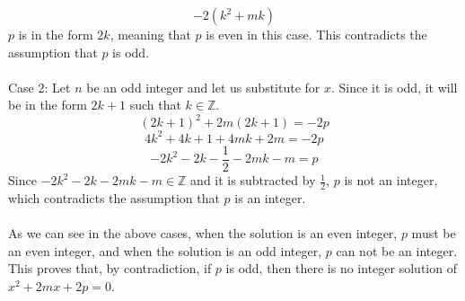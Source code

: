 \documentclass{article}
\begin{document}
\begin{enumerate}[label=\textbf{\arabic*}.]
    \[-2(k^2+mk)\]
    $p$ is in the form $2k$, meaning that $p$ is even in this case. This contradicts the assumption that $p$ is odd.\\\\
    Case 2: Let $n$ be an odd integer and let us substitute for $x$. Since it is odd, it will be in the form $2k+1$ such that $k \in \mathbb{Z}$.
    \[(2k+1)^2+2m(2k+1)=-2p\]
    \[4k^2+4k+1+4mk+2m=-2p\]
    \[-2k^2-2k-\frac{1}{2}-2mk-m=p\]
    Since $-2k^2-2k-2mk-m \in \mathbb{Z}$ and it is subtracted by $\frac{1}{2}$, $p$ is not an integer, which contradicts the assumption that $p$ is an integer. \\\\
    As we can see in the above cases, when the solution is an even integer, $p$ must be an even integer, and when the solution is an odd integer, $p$ can not be an integer. This proves that, by contradiction, if $p$ is odd, then there is no integer solution of $x^2+2mx+2p=0$.
\end{enumerate}
\end{document}
